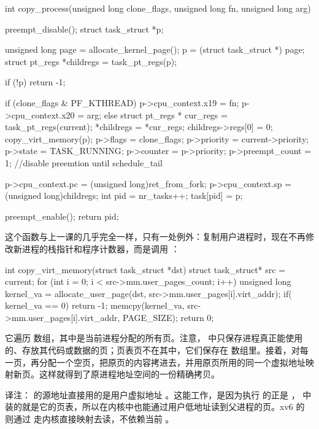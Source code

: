 \begin{ccode}
int copy_process(unsigned long clone_flags, unsigned long fn, unsigned long arg)
{
	preempt_disable();
	struct task_struct *p;

	unsigned long page = allocate_kernel_page();
	p = (struct task_struct *) page;
	struct pt_regs *childregs = task_pt_regs(p);

	if (!p)
		return -1;

	if (clone_flags & PF_KTHREAD) {
		p->cpu_context.x19 = fn;
		p->cpu_context.x20 = arg;
	} else {
		struct pt_regs * cur_regs = task_pt_regs(current);
		*childregs = *cur_regs;
		childregs->regs[0] = 0;
		copy_virt_memory(p);
	}
	p->flags = clone_flags;
	p->priority = current->priority;
	p->state = TASK_RUNNING;
	p->counter = p->priority;
	p->preempt_count = 1; //disable preemtion until schedule_tail

	p->cpu_context.pc = (unsigned long)ret_from_fork;
	p->cpu_context.sp = (unsigned long)childregs;
	int pid = nr_tasks++;
	task[pid] = p;

	preempt_enable();
	return pid;
}
\end{ccode}

这个函数与上一课的几乎完全一样，只有一处例外：复制用户进程时，现在不再修改新进程的栈指针和程序计数器，而是调用 ：

\begin{ccode}
int copy_virt_memory(struct task_struct *dst) {
	struct task_struct* src = current;
	for (int i = 0; i < src->mm.user_pages_count; i++) {
		unsigned long kernel_va = allocate_user_page(dst, src->mm.user_pages[i].virt_addr);
		if( kernel_va == 0) {
			return -1;
		}
		memcpy(kernel_va, src->mm.user_pages[i].virt_addr, PAGE_SIZE);
	}
	return 0;
}
\end{ccode}

它遍历  数组，其中是当前进程分配的所有页。注意， 中只保存进程真正能使用的、存放其代码或数据的页；页表页不在其中，它们保存在  数组里。接着，对每一页，再分配一个空页，把原页的内容拷进去，并用原页所用的同一个虚拟地址映射新页。这样就得到了原进程地址空间的一份精确拷贝。

\begin{remark}
  译注： 的源地址直接用的是用户虚拟地址 。这能工作，是因为执行  的正是 ， 中装的就是它的页表，所以在内核中也能通过用户低地址读到父进程的页。xv6 的  则通过  走内核直接映射去读，不依赖当前 。
\end{remark}

